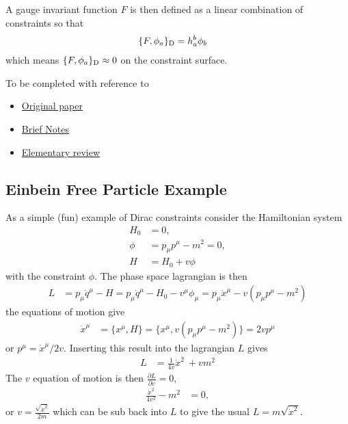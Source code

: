 \documentclass[notitlepage,amsmath,amssymb,aps, pra, 10pt]{revtex4-1}
\newcommand{\pd}[2][]{\frac{\partial#1}{\partial#2}}
\begin{document}
        A gauge invariant function $F$ is then defined as a linear combination of constraints so that
        \begin{align}
            \{F, \phi_a\}_{\rm D} &= h_a^{b} \phi_b
        \end{align}
        which means $\{F, \phi_a\}_{\rm D}\approx 0 $ on the constraint surface.
        {\color{red} To be completed with reference to
        \begin{itemize}
            \item \href{http://www.actaphys.uj.edu.pl/_old/vol13/pdf/v13p0669.pdf}{Original paper}
            \item \href{http://www.ift.unesp.br/users/nastase/hqbrst.pdf}{Brief Notes}
            \item \href{http://www.slac.stanford.edu/cgi-wrap/getdoc/slac-pub-4422.pdf}{Elementary review}
        \end{itemize}
        }

    \subsection{Einbein Free Particle Example}
    As a simple (fun) example of Dirac constraints consider the Hamiltonian system
    \begin{align}
        H_0 &= 0, \\
        \phi &= p_{\mu} p^{\mu} - m^2 = 0,\\
        H &= H_0 + v \phi
    \end{align}
    with the constraint $\phi$. The phase space lagrangian is then
    \begin{align}
        L &= p_{\mu} \dot q^{\mu} - H = p_{\mu} \dot q^{\mu} - H_0 - v^{\mu}\phi_{\mu} = p_{\mu}\dot x^{\mu} -v(p_{\mu} p^{\mu} - m^2)
    \end{align}
    the equations of motion give
    \begin{align}
      \dot x^{\mu} &=  \{x^{\mu}, H \} = \{x^{\mu}, v(p_{\mu} p^{\mu} - m^2)\} = 2 v p^{\mu}
    \end{align}
    or $p^{\mu} = \dot x^{\mu} / 2v$. Inserting this result into the lagrangian $L$ gives
    \begin{align}
        L &= \frac{1}{4v} \dot x^2\ + v m^2
    \end{align}
    The $v$ equation of motion is then $\pd[L]{v} = 0$,
    \begin{align}
        \frac{\dot x^{2}}{4v^2} - m^2 &=0,
    \end{align}
    or $v = \frac{\sqrt{\dot x^2}}{2m}$ which can be sub back into $L$ to give the usual
   $L = m \sqrt{\dot x^2}$.
   
\end{document}

